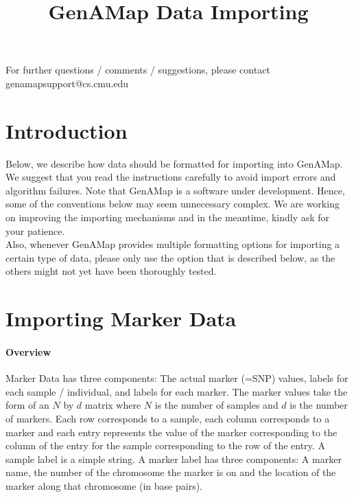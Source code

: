 \documentclass{article}
\title{GenAMap Data Importing}
\author{}
\date{}
\begin{document}
\maketitle

\begin{raggedright}
For further questions / comments / suggestions, please contact genamapsupport@cs.cmu.edu

\end{raggedright}

\section{Introduction}

Below, we describe how data should be formatted for importing into GenAMap. We suggest that you read the instructions carefully to avoid import errors and algorithm failures. Note that GenAMap is a software under development. Hence, some of the conventions below may seem unnecessary complex. We are working on improving the importing mechanisms and in the meantime, kindly ask for your patience. \\

Also, whenever GenAMap provides multiple formatting options for importing a certain type of data, please only use the option that is described below, as the others might not yet have been thoroughly tested. 

\section{Importing Marker Data}

\paragraph{Overview} Marker Data has three components: The actual marker (=SNP) values, labels for each sample / individual, and labels for each marker. The marker values take the form of an $N$ by $d$ matrix where $N$ is the number of samples and $d$ is the number of markers. Each row corresponds to a sample, each column corresponds to a marker and each entry represents the value of the marker corresponding to the column of the entry for the sample corresponding to the row of the entry. A sample label is a simple string. A marker label has three components: A marker name, the number of the chromosome the marker is on and the location of the marker along that chromosome (in base pairs).
\end{document}
